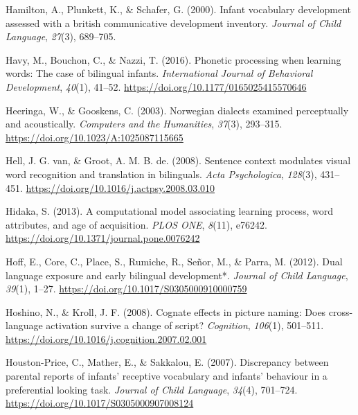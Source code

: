 \documentclass[
]{article}
\newlength{\cslhangindent}
\newlength{\cslentryspacingunit} %
\newenvironment{CSLReferences}[2] %
 {%
  \setlength{\parindent}{0pt}
  \ifodd #1
  \let\oldpar\par
  \def\par{\hangindent=\cslhangindent\oldpar}
  \fi
  \setlength{\parskip}{#2\cslentryspacingunit}
 }%
 {}
\begin{document}
\begin{CSLReferences}{1}{0}
\leavevmode{}%
Hamilton, A., Plunkett, K., \& Schafer, G. (2000). Infant vocabulary
development assessed with a british communicative development inventory.
\emph{Journal of Child Language}, \emph{27}(3), 689--705.

\leavevmode{}%
Havy, M., Bouchon, C., \& Nazzi, T. (2016). Phonetic processing when
learning words: The case of bilingual infants. \emph{International
Journal of Behavioral Development}, \emph{40}(1), 41--52.
\url{https://doi.org/10.1177/0165025415570646}

\leavevmode{}%
Heeringa, W., \& Gooskens, C. (2003). Norwegian dialects examined
perceptually and acoustically. \emph{Computers and the Humanities},
\emph{37}(3), 293--315. \url{https://doi.org/10.1023/A:1025087115665}

\leavevmode{}%
Hell, J. G. van, \& Groot, A. M. B. de. (2008). Sentence context
modulates visual word recognition and translation in bilinguals.
\emph{Acta Psychologica}, \emph{128}(3), 431--451.
\url{https://doi.org/10.1016/j.actpsy.2008.03.010}

\leavevmode{}%
Hidaka, S. (2013). A computational model associating learning process,
word attributes, and age of acquisition. \emph{{PLOS} {ONE}},
\emph{8}(11), e76242. \url{https://doi.org/10.1371/journal.pone.0076242}

\leavevmode{}%
Hoff, E., Core, C., Place, S., Rumiche, R., Señor, M., \& Parra, M.
(2012). Dual language exposure and early bilingual development*.
\emph{Journal of Child Language}, \emph{39}(1), 1--27.
\url{https://doi.org/10.1017/S0305000910000759}

\leavevmode{}%
Hoshino, N., \& Kroll, J. F. (2008). Cognate effects in picture naming:
Does cross-language activation survive a change of script?
\emph{Cognition}, \emph{106}(1), 501--511.
\url{https://doi.org/10.1016/j.cognition.2007.02.001}

\leavevmode{}%
Houston-Price, C., Mather, E., \& Sakkalou, E. (2007). Discrepancy
between parental reports of infants' receptive vocabulary and infants'
behaviour in a preferential looking task. \emph{Journal of Child
Language}, \emph{34}(4), 701--724.
\url{https://doi.org/10.1017/S0305000907008124}


\end{CSLReferences}
\end{document}
